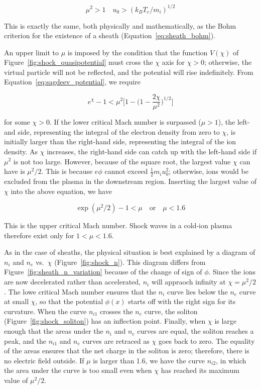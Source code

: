 \documentclass[
  notoc %
]{tufte-book}
\begin{document}
\[
\mu^2 > 1 \quad u_0>(k_BT_e/m_i)^{1/2}
\]

This is exactly the same, both physically and mathematically, as the
Bohm criterion for the existence of a sheath
(Equation~\ref{eq:sheath_bohm}).

An upper limit to \(\mu\) is imposed by the condition that the function
\(V(\chi)\) of Figure~\ref{fig:shock_quasipotential} must cross the
\(\chi\) axis for \(\chi>0\); otherwise, the virtual particle will not
be reflected, and the potential will rise indefinitely. From
Equation~\ref{eq:sagdeev_potential}, we require

\[
e^\chi - 1 < \mu^2 \Big[ 1- \big( 1-\frac{2\chi}{\mu^2} \Big)^{1/2} \Big]
\]

for some \(\chi>0\). If the lower critical Mach number is surpassed
(\(\mu>1\)), the left-and side, representing the integral of the
electron density from zero to \(\chi\), is initially larger than the
right-hand side, representing the integral of the ion density. As
\(\chi\) increases, the right-hand side can catch up with the left-hand
side if \(\mu^2\) is not too large. However, because of the square root,
the largest value \(\chi\) can have is \(\mu^2/2\). This is because
\(e\phi\) cannot exceed \(\frac{1}{2}m_iu_0^2\); otherwise, ions would
be excluded from the plasma in the downstream region. Inserting the
largest value of \(\chi\) into the above equation, we have

\[
\exp(\mu^2/2) - 1 < \mu \quad\text{or}\quad \mu < 1.6
\]

This is the upper critical Mach number. Shock waves in a cold-ion plasma
therefore exist only for \(1<\mu<1.6\).

As in the case of sheaths, the physical situation is best explained by a
diagram of \(n_i\) and \(n_e\) vs.~\(\chi\) (Figure~\ref{fig:shock_n}).
This diagram differs from Figure~\ref{fig:sheath_n_variation} because of
the change of sign of \(\phi\). Since the ions are now decelerated
rather than accelerated, \(n_i\) will appraoch infinity at
\(\chi=\mu^2/2\). The lowe critical Mach number ensures that the \(n_i\)
curve lies below the \(n_e\) curve at small \(\chi\), so that the
potential \(\phi(x)\) starts off with the right sign for its curvature.
When the curve \(n_{i1}\) crosses the \(n_e\) curve, the soliton
(Figure~\ref{fig:shock_soliton}) has an inflection point. Finally, when
\(\chi\) is large enough that the areas under the \(n_i\) and \(n_e\)
curves are equal, the soliton reaches a peak, and the \(n_{i1}\) and
\(n_e\) curves are retraced as \(\chi\) goes back to zero. The equality
of the areas ensures that the net charge in the soliton is zero;
therefore, there is no electric field outside. If \(\mu\) is larger than
1.6, we have the curve \(n_{i2}\), in which the area under the curve is
too small even when \(\chi\) has reached its maximum value of
\(\mu^2/2\).
\end{document}
